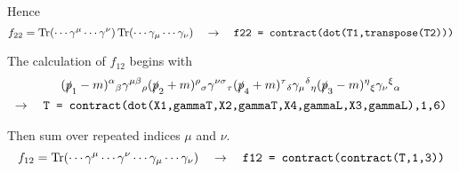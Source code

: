 Hence
$$
f_{22}=
\mathop{\rm Tr}(\cdots\gamma^\mu\cdots\gamma^\nu)
\mathop{\rm Tr}(\cdots\gamma_\mu\cdots\gamma_\nu)
\quad\rightarrow\quad
\text{\tt f22 = contract(dot(T1,transpose(T2)))}
$$

The calculation of $f_{12}$ begins with
\begin{multline*}
(\slashed{p}_1-m)^\alpha{}_\beta
\gamma^{\mu\beta}{}_\rho
(\slashed{p}_2+m)^\rho{}_\sigma
\gamma^{\nu\sigma}{}_\tau
(\slashed{p}_4+m)^\tau{}_\delta
\gamma_\mu{}^\delta{}_\eta
(\slashed{p}_3-m)^\eta{}_\xi
\gamma_\nu{}^\xi{}_\alpha
\\
\rightarrow\quad
\text{\tt T = contract(dot(X1,gammaT,X2,gammaT,X4,gammaL,X3,gammaL),1,6)}
\end{multline*}

Then sum over repeated indices $\mu$ and $\nu$.
$$
f_{12}=\mathop{\rm Tr}(\cdots\gamma^\mu\cdots\gamma^\nu\cdots\gamma_\mu\cdots\gamma_\nu)
\quad\rightarrow\quad
\text{\tt f12 = contract(contract(T,1,3))}
$$


